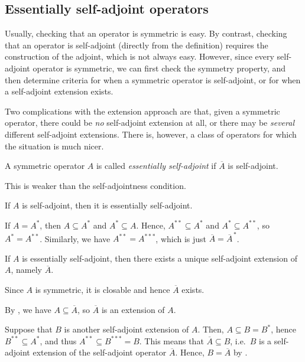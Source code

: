 \subsection{Essentially self-adjoint operators}

Usually, checking that an operator is symmetric is easy. By contrast, checking that an operator is self-adjoint (directly from the definition) requires the construction of the adjoint, which is not always easy. However, since every self-adjoint operator is symmetric, we can first check the symmetry property, and then determine criteria for when a symmetric operator is self-adjoint, or for when a self-adjoint extension exists.

Two complications with the extension approach are that, given a symmetric operator, there could be \emph{no} self-adjoint extension at all, or there may be \emph{several} different self-adjoint extensions. There is, however, a class of operators for which the situation is much nicer.

\bd
A symmetric operator $A$ is called \emph{essentially self-adjoint} if $\overline{A}$ is self-adjoint.
\ed

This is weaker than the self-adjointness condition.

\bp
If $A$ is self-adjoint, then it is essentially self-adjoint. 
\ep

\bq
If $A = A^*$, then $A\subseteq A^*$ and $A^* \subseteq A$. Hence, $A^{**}\subseteq A^*$ and $A^*\subseteq A^{**}$, so $A^* = A^{**}$. Similarly, we have $A^{**} = A^{***}$, which is just $\overline{A}=\overline{A}^{\,*}$.
\eq

\bt
If $A$ is essentially self-adjoint, then there exists a unique self-adjoint extension of $A$, namely $\overline{A}$.
\et

\bq
\ben[label=(\roman*)]
\item Since $A$ is symmetric, it is closable and hence $\overline{A}$ exists.
\item By , we have $A\subseteq \overline{A}$, so $\overline{A}$ is an extension of $A$. 
\item Suppose that $B$ is another self-adjoint extension of $A$. Then, $A\subseteq B = B^*$, hence $B^{**}\subseteq A^*$, and thus $A^{**}\subseteq B^{***}=B$. This means that $\overline{A}\subseteq B$, i.e.\ $B$ is a self-adjoint extension of the self-adjoint operator $\overline{A}$. Hence, $B=\overline{A}$ by .\qedhere
\een
\eq

